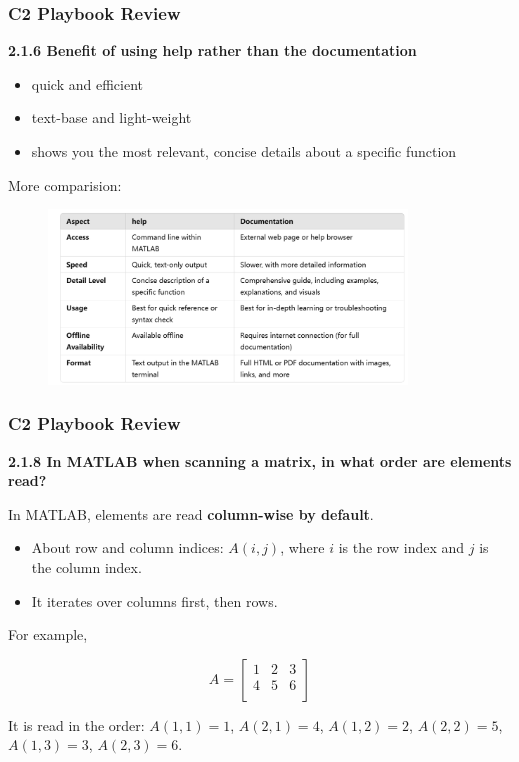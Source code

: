 \documentclass[
	11pt, %
]{beamer}
\begin{document}

\begin{frame}
	\frametitle{C2 Playbook Review}
	\textbf{2.1.6 Benefit of using help rather than the documentation}
    \begin{itemize}
        \item quick and efficient
        \item text-base and light-weight
        \item shows you the most relevant, concise details about a specific function
    \end{itemize}
    
    More comparision:

    \begin{figure}
        \centering
        \includegraphics[width=0.85\textwidth]{doc_help.png}
    \end{figure}
    \end{frame}

\begin{frame}
    \frametitle{C2 Playbook Review}
    \textbf{2.1.8 In MATLAB when scanning a matrix, in what order are elements read?}

    In MATLAB, elements are read \textbf{column-wise by default}.

    \begin{itemize}
        \item About row and column indices: $A(i,j)$, where $i$ is the row index and $j$ is the column index.
        \item It iterates over columns first, then rows.
    \end{itemize}

    For example, 
    \begin{center}
        \[
        A = \begin{bmatrix}
        1 & 2 & 3 \\
        4 & 5 & 6\\
        \end{bmatrix}
        \]
    \end{center}
    It is read in the order: $A(1,1)=1$, $A(2,1)=4$, $A(1,2)=2$, $A(2,2)=5$, $A(1,3)=3$, $A(2,3)=6$.
\end{frame}
\end{document}
